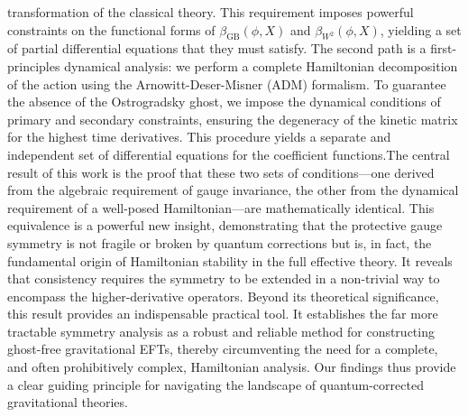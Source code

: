 \documentclass[twocolumn]{aastex631}
\begin{document}
transformation of the classical theory. This requirement imposes powerful constraints on the functional forms of $\beta_{\text{GB}}(\phi, X)$ and $\beta_{W^2}(\phi, X)$, yielding a set of partial differential equations that they must satisfy. The second path is a first-principles dynamical analysis: we perform a complete Hamiltonian decomposition of the action using the Arnowitt-Deser-Misner (ADM) formalism. To guarantee the absence of the Ostrogradsky ghost, we impose the dynamical conditions of primary and secondary constraints, ensuring the degeneracy of the kinetic matrix for the highest time derivatives. This procedure yields a separate and independent set of differential equations for the coefficient functions.The central result of this work is the proof that these two sets of conditions---one derived from the algebraic requirement of gauge invariance, the other from the dynamical requirement of a well-posed Hamiltonian---are mathematically identical. This equivalence is a powerful new insight, demonstrating that the protective gauge symmetry is not fragile or broken by quantum corrections but is, in fact, the fundamental origin of Hamiltonian stability in the full effective theory. It reveals that consistency requires the symmetry to be extended in a non-trivial way to encompass the higher-derivative operators. Beyond its theoretical significance, this result provides an indispensable practical tool. It establishes the far more tractable symmetry analysis as a robust and reliable method for constructing ghost-free gravitational EFTs, thereby circumventing the need for a complete, and often prohibitively complex, Hamiltonian analysis. Our findings thus provide a clear guiding principle for navigating the landscape of quantum-corrected gravitational theories.
\end{document}
